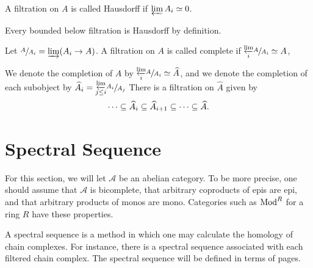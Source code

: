 \documentclass[../thesis.tex]{subfiles}
\begin{document}
        \begin{definition}
            A filtration on $A$ is called Hausdorff if $\varprojlim A_i \simeq 0$.
        \end{definition}

        Every bounded below filtration is Hausdorff by definition.

        \begin{definition}
            Let $\sfrac{A}{A_i} = \varinjlim(A_i \rightarrow A)$. A filtration on $A$ is called complete if $\substack{\varprojlim \\ i} \sfrac{A}{A_i} \simeq A$,
            \begin{center}
            \end{center}
        \end{definition}
        
        We denote the completion of $A$ by $\substack{\varprojlim \\ i} \sfrac{A}{A_i} \simeq \widehat{A}$, and we denote the completion of each subobject by $\widehat{A}_i = \substack{\varprojlim \\ j \leq i} \sfrac{A_i}{A_j}$ There is a filtration on $\widehat{A}$ given by
        \begin{align*}
            \cdots \subseteq \widehat{A}_i \subseteq \widehat{A}_{i+1} \subseteq \cdots \subseteq \widehat{A}\tt{.}
        \end{align*}

    \section{Spectral Sequence}
    
        For this section, we will let $\mathcal{A}$ be an abelian category. To be more precise, one should assume that $\mathcal{A}$ is bicomplete, that arbitrary coproducts of epis are epi, and that arbitrary products of monos are mono. Categories such as $\tt{Mod}^R$ for a ring $R$ have these properties.

        A spectral sequence is a method in which one may calculate the homology of chain complexes. For instance, there is a spectral sequence associated with each filtered chain complex. The spectral sequence will be defined in terms of pages.
\end{document}
